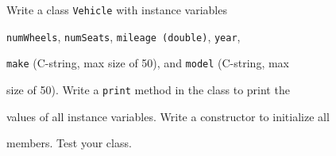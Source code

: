 Write a class \texttt{Vehicle} with instance variables

\texttt{numWheels}, \texttt{numSeats}, \texttt{mileage (double)}, \texttt{year},

\texttt{make} (C-string, max size of 50), and \texttt{model} (C-string, max

size of 50). Write a \texttt{print} method in the class to print the

values of all instance variables. Write a constructor to initialize all

members. Test your class.

